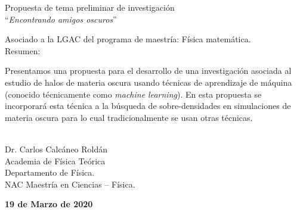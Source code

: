 \documentclass[12pt,spanish]{article}
\newcommand{\mydate}{19 de Marzo de 2020}
\begin{document}
\thispagestyle{empty}
\setcounter{page}{0}
\begin{center}
  {\Large Propuesta de tema preliminar de investigación\\
  ``{\it Encontrando amigos oscuros}''}
\end{center} 

\vspace{12em}
\begin{center}
  {\large Asociado a la LGAC del programa de maestría: Física matemática. \\}
\vspace{4em}
{\large Resumen:}
\end{center}
Presentamos una propuesta para el desarrollo de una investigación
asociada al estudio de halos de materia oscura usando técnicas de
aprendizaje de máquina (conocido técnicamente como {\it machine
  learning}). En esta propuesta se incorporará esta técnica a la búsqueda
de sobre-densidades en simulaciones de materia oscura para lo cual
tradicionalmente se usan otras técnicas.

\begin{flushright}
\\
\vspace{-4ex}
Dr. Carlos Calc\'aneo Rold\'an\\
Academia de Física Teórica\\
Departamento de Física.\\
NAC Maestría en Ciencias \--- Física. 
\end{flushright}


\vspace{5em}
%

\vfill
\begin{flushright}
{\bf \mydate}
\end{flushright}
\newpage
\end{document}
